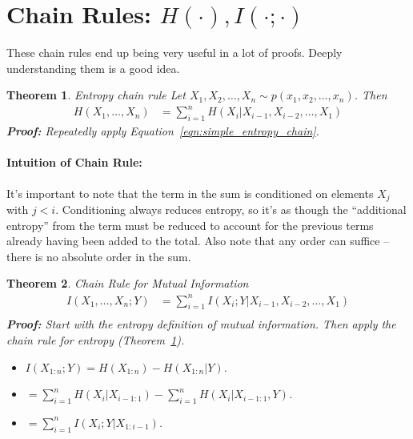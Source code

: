 \documentclass[a4paper,12pt]{report}
\newtheorem{theorem}{Theorem}
\begin{document}
\section{Chain Rules: $H(\cdot), I(\cdot ; \cdot)$}

These chain rules end up being very useful in a lot of proofs. Deeply
understanding them is a good idea. 

\begin{theorem}{Entropy chain rule}
\label{thm:entropy_chain_rule}
Let $X_1, X_2, \dots, X_n \sim p(x_1, x_2, \dots, x_n)$. Then 
\begin{align}
	\label{eqn:entropy_chain_rule}
	H(X_1, \dots, X_n) &= \sum_{i=1}^{n} H(X_i | X_{i-1}, X_{i-2}, \dots, X_1)
\end{align}
\textbf{Proof: } Repeatedly apply Equation~\ref{eqn:simple_entropy_chain}.
\end{theorem}

\paragraph{Intuition of Chain Rule: } It's important to note that the term in
the sum is conditioned on elements $X_j$ with $j < i$. Conditioning always
reduces entropy, so it's as though the ``additional entropy'' from the term must
be reduced to account for the previous terms already having been added to the
total. Also note that any order can suffice -- there is no absolute order in the
sum.



\begin{theorem}{Chain Rule for Mutual Information}
\begin{align}
	\label{eqn:chain_rule_MI}
	I(X_1, \dots, X_n; Y) &= \sum_{i=1}^{n} I(X_i; Y | X_{i-1}, X_{i-2}, \dots,
	X_1) \\
\end{align}
\textbf{Proof: } Start with the entropy definition of mutual information. Then
apply the chain rule for entropy (Theorem~\ref{thm:entropy_chain_rule}).
\begin{itemize}
\item $I(X_{1:n} ; Y) = H(X_{1:n}) - H(X_{1:n} | Y)$.
\item $= \sum_{i=1}^{n} H(X_i | X_{i-1:1}) - \sum_{i=1}^{n} H(X_i | X_{i-1:1},
Y)$.
\item $= \sum_{i=1}^{n} I(X_i; Y | X_{1:i-1})$.
\end{itemize}
\end{theorem}
\end{document}
